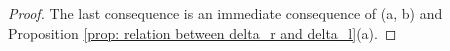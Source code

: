 \documentclass[a4paper,10pt]{amsart}
\theoremstyle{definition}
\numberwithin{equation}{section}
\DeclareMathOperator{\id}{id}
\begin{document}
\begin{proof}

The last consequence is an immediate consequence of (a, b) and Proposition \ref{prop: relation between delta_r and delta_l}(a).
\end{proof}
\end{document}
